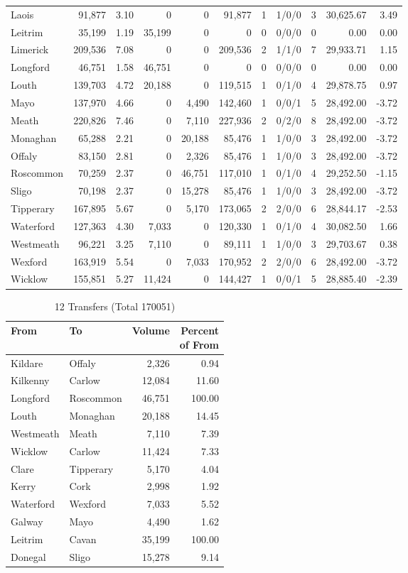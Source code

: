 \documentclass[a4paper]{article}
\begin{document}
\begin{longtable}{lrrrrrrlrrr}
Laois&91,877& 3.10&0&0&91,877&1&1/0/0&3&30,625.67& 3.49\\ 
Leitrim&35,199& 1.19&35,199&0&0&0&0/0/0&0& 0.00& 0.00\\ 
Limerick&209,536& 7.08&0&0&209,536&2&1/1/0&7&29,933.71& 1.15\\ 
Longford&46,751& 1.58&46,751&0&0&0&0/0/0&0& 0.00& 0.00\\ 
Louth&139,703& 4.72&20,188&0&119,515&1&0/1/0&4&29,878.75& 0.97\\ 
Mayo&137,970& 4.66&0&4,490&142,460&1&0/0/1&5&28,492.00&-3.72\\ 
Meath&220,826& 7.46&0&7,110&227,936&2&0/2/0&8&28,492.00&-3.72\\ 
Monaghan&65,288& 2.21&0&20,188&85,476&1&1/0/0&3&28,492.00&-3.72\\ 
Offaly&83,150& 2.81&0&2,326&85,476&1&1/0/0&3&28,492.00&-3.72\\ 
Roscommon&70,259& 2.37&0&46,751&117,010&1&0/1/0&4&29,252.50&-1.15\\ 
Sligo&70,198& 2.37&0&15,278&85,476&1&1/0/0&3&28,492.00&-3.72\\ 
Tipperary&167,895& 5.67&0&5,170&173,065&2&2/0/0&6&28,844.17&-2.53\\ 
Waterford&127,363& 4.30&7,033&0&120,330&1&0/1/0&4&30,082.50& 1.66\\ 
Westmeath&96,221& 3.25&7,110&0&89,111&1&1/0/0&3&29,703.67& 0.38\\ 
Wexford&163,919& 5.54&0&7,033&170,952&2&2/0/0&6&28,492.00&-3.72\\ 
Wicklow&155,851& 5.27&11,424&0&144,427&1&0/0/1&5&28,885.40&-2.39\\ 
\end{longtable}

\begin{table}[htbp]
\caption{12 Transfers (Total 170051)}
\centering
\begin{tabular}{llrr} \toprule
From &To &Volume &\shortstack{Percent\\of From} \\ \midrule
Kildare&Offaly&2,326& 0.94\\ 
Kilkenny&Carlow&12,084&11.60\\ 
Longford&Roscommon&46,751&100.00\\ 
Louth&Monaghan&20,188&14.45\\ 
Westmeath&Meath&7,110& 7.39\\ 
Wicklow&Carlow&11,424& 7.33\\ 
Clare&Tipperary&5,170& 4.04\\ 
Kerry&Cork&2,998& 1.92\\ 
Waterford&Wexford&7,033& 5.52\\ 
Galway&Mayo&4,490& 1.62\\ 
Leitrim&Cavan&35,199&100.00\\ 
Donegal&Sligo&15,278& 9.14\\ 
\bottomrule
\end{tabular}
\end{table}
\end{document}
